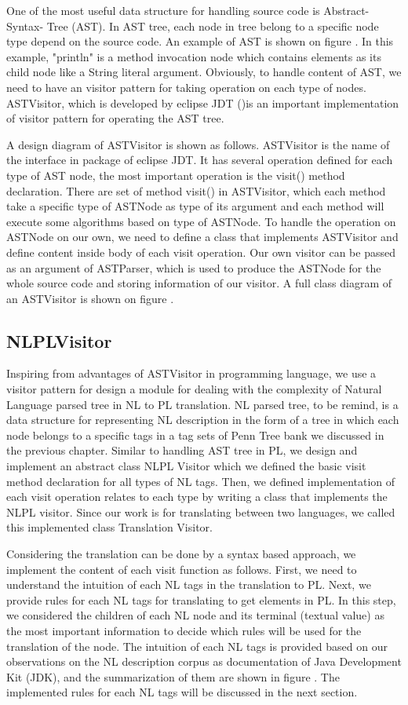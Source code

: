 One of the most useful data structure for handling source code is Abstract-Syntax- Tree (AST). In AST tree, each node in tree belong to a specific node type depend on the source code. An example of AST is shown on figure \cite{}. In this example, "println" is a method invocation node which contains elements as its child node like a String literal argument. Obviously, to handle content of AST, we need to have an visitor pattern for taking operation on each type of nodes. ASTVisitor, which is developed by eclipse JDT (\cite{})is an important implementation of visitor pattern for operating the AST tree.

A design diagram of ASTVisitor is shown as follows. ASTVisitor is the name of the interface in package of eclipse JDT. It has several operation defined for each type of AST node, the most important operation is the visit() method declaration. There are set of method visit() in ASTVisitor, which each method take a specific type of ASTNode as type of its argument and each method will execute some algorithms based on type of ASTNode. To handle the operation on ASTNode on our own, we need to define a class that implements ASTVisitor and define content inside body of each visit operation. Our own visitor can be passed as an argument of ASTParser, which is used to produce the ASTNode for the whole source code and storing information of our visitor. A full class diagram of an ASTVisitor is shown on figure \cite{}.
 
\subsection{NLPLVisitor}
Inspiring from advantages of ASTVisitor in programming language, we use a visitor pattern for design a module for dealing with the complexity of Natural Language parsed tree in NL to PL translation. NL parsed tree, to be remind, is a data structure for representing NL description in the form of a tree in which each node belongs to a specific tags in a tag sets of Penn Tree bank we discussed in the previous chapter. Similar to handling AST tree in PL, we design and implement an abstract class NLPL Visitor which we defined the basic visit method declaration for all types of NL tags. Then, we defined implementation of each visit operation relates to each type by writing a class that implements the NLPL visitor. Since our work is for translating between two languages, we called this implemented class Translation Visitor. 

Considering the translation can be done by a syntax based approach, we implement the content of each visit function as follows. First, we need to understand the intuition of each NL tags in the translation to PL. Next, we provide rules for each NL tags for translating to get  elements in PL. In this step, we considered the children of each NL node and its terminal (textual value) as the most important information to decide which rules will be used for the translation of the node. The intuition of each NL tags is provided based on our observations on the NL description corpus as documentation of Java Development Kit (JDK), and the summarization of them are shown in figure \cite{}. The implemented rules for each NL tags will be discussed in the next section.

